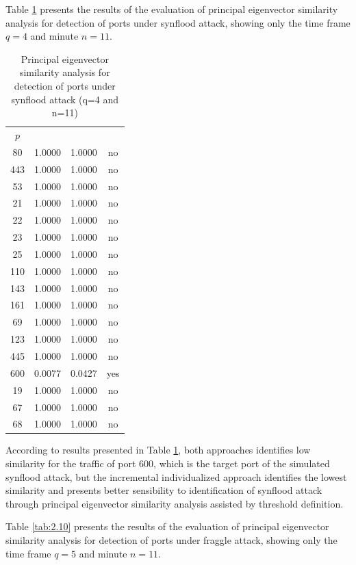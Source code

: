 Table \ref{tab:2.09} presents the results of the evaluation of principal eigenvector similarity analysis for detection of ports under synflood attack, showing only the time frame $q=4$ and minute $n=11$.

\begin{table}[h!]
  \centering
  \footnotesize
  \caption{Principal eigenvector similarity analysis for detection of ports under synflood attack (q=4 and n=11)}
  \label{tab:2.09}
  \begin{tabular}{ c c c c }
	\toprule
	\multirow{2}{*}{\pmb{Port} $p$}   &\multicolumn{2}{c}{\pmb{Approaches}} &\multirow{2}{*}{\pmb{Ground Truth}}\\ 
			\hhline{~--~}
			&\pmb{Incremental Individualized} &\pmb{Individual}\\
	\midrule
	80 &1.0000 &1.0000 &no \\
	443 &1.0000 &1.0000 &no \\
	53 &1.0000 &1.0000 &no \\
	21 &1.0000 &1.0000 &no \\
	22 &1.0000 &1.0000 &no \\
	23 &1.0000 &1.0000 &no \\
	25 &1.0000 &1.0000 &no \\
	110 &1.0000 &1.0000 &no \\
	143 &1.0000 &1.0000 &no \\
	161 &1.0000 &1.0000 &no \\
	69 &1.0000 &1.0000 &no \\
	123 &1.0000 &1.0000 &no \\
	445 &1.0000 &1.0000 &no \\
	600 &0.0077 &0.0427 &yes \\
	19 &1.0000 &1.0000 &no \\
	67 &1.0000 &1.0000 &no \\
	68 &1.0000 &1.0000 &no \\
    \bottomrule
  \end{tabular}
\end{table}

According to results presented in Table \ref{tab:2.09}, both approaches identifies low similarity for the traffic of port 600, which is the target port of the simulated synflood attack, but the incremental individualized approach identifies the lowest similarity and presents better sensibility to identification of synflood attack through principal eigenvector similarity analysis assisted by threshold definition.

Table \ref{tab:2.10} presents the results of the evaluation of principal eigenvector similarity analysis for detection of ports under fraggle attack, showing only the time frame $q=5$ and minute $n=11$.

